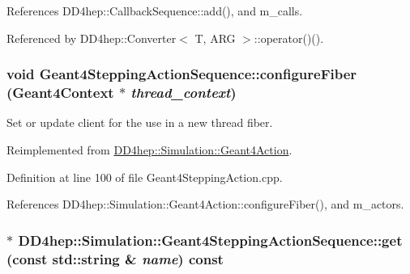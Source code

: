 References DD4hep::CallbackSequence::add(), and m\_\-calls.

Referenced by DD4hep::Converter$<$ T, ARG $>$::operator()().\hypertarget{class_d_d4hep_1_1_simulation_1_1_geant4_stepping_action_sequence_ad5680d2d225421b9cf2cd6b530d3ab5f}{
\subsubsection[{configureFiber}]{\setlength{\rightskip}{0pt plus 5cm}void Geant4SteppingActionSequence::configureFiber ({\bf Geant4Context} $\ast$ {\em thread\_\-context})}}
\label{class_d_d4hep_1_1_simulation_1_1_geant4_stepping_action_sequence_ad5680d2d225421b9cf2cd6b530d3ab5f}


Set or update client for the use in a new thread fiber. 

Reimplemented from \hyperlink{class_d_d4hep_1_1_simulation_1_1_geant4_action_a6adc7138508303e4e417cb48a737ab19}{DD4hep::Simulation::Geant4Action}.

Definition at line 100 of file Geant4SteppingAction.cpp.

References DD4hep::Simulation::Geant4Action::configureFiber(), and m\_\-actors.\hypertarget{class_d_d4hep_1_1_simulation_1_1_geant4_stepping_action_sequence_a4295188144ad3820c331056a143af5d1}{
\subsubsection[{get}]{$\ast$ DD4hep::Simulation::Geant4SteppingActionSequence::get (const std::string \& {\em name}) const}}
\label{class_d_d4hep_1_1_simulation_1_1_geant4_stepping_action_sequence_a4295188144ad3820c331056a143af5d1}


